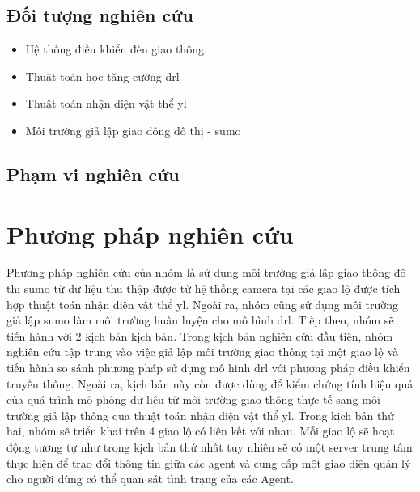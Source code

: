 \subsection{Đối tượng nghiên cứu}
\begin{itemize}
    \item Hệ thống điều khiển đèn giao thông

    \item Thuật toán học tăng cường \ac{drl}

    \item Thuật toán nhận diện vật thể \ac{yl}

    \item Môi trường giả lập giao đông đô thị - \ac{sumo}
\end{itemize}
\subsection{Phạm vi nghiên cứu}

\section{Phương pháp nghiên cứu}
Phương pháp nghiên cứu của nhóm là sử dụng môi trường giả lập giao thông đô thị \ac{sumo}
từ dữ liệu thu thập được từ hệ thống camera tại các giao lộ được tích hợp thuật
toán nhận diện vật thể \ac{yl}. Ngoài ra, nhóm cũng sử dụng môi trường giả lập \ac{sumo}
làm môi trường huấn luyện cho mô hình \ac{drl}. Tiếp theo, nhóm sẽ tiến hành với
2 kịch bản kịch bản. Trong kịch bản nghiên cứu đầu tiên, nhóm nghiên cứu tập trung
vào việc giả lập môi trường giao thông tại một giao lộ và tiến hành so sánh phương
pháp sử dụng mô hình \ac{drl} với phương pháp điều khiển truyền thống. Ngoài ra,
kịch bản này còn được dùng để kiểm chứng tính hiệu quả của quá trình mô phỏng dữ
liệu từ môi trường giao thông thực tế sang môi trường giả lập thông qua thuật
toán nhận diện vật thể \ac{yl}. Trong kịch bản thứ hai, nhóm sẽ triển khai trên 4
giao lộ có liên kết với nhau. Mỗi giao lộ sẽ hoạt động tương tự như trong kịch
bản thứ nhất tuy nhiên sẽ có một server trung tâm thực hiện để trao đổi thông
tin giữa các agent và cung cấp một giao diện quản lý cho người dùng có thể quan
sát tình trạng của các Agent.

